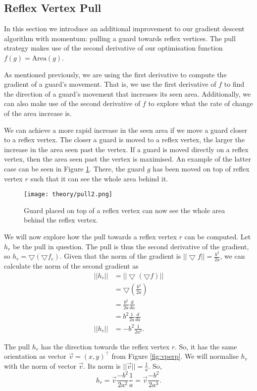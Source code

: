 \subsection{Reflex Vertex Pull}

In this section we introduce an additional improvement to our gradient descent algorithm with momentum: pulling a guard towards reflex vertices. The pull strategy makes use of the second derivative of our optimisation function $f(g) = \text{Area}(g)$.



As mentioned previously, we are using the first derivative to compute the gradient of a guard's movement. That is, we use the first derivative of $f$ to find the direction of a guard's movement that increases its seen area. Additionally, we can also make use of the second derivative of $f$ to explore what the rate of change of the area increase is. 

We can achieve a more rapid increase in the seen area if we move a guard closer to a reflex vertex. The closer a guard is moved to a reflex vertex, the larger the increase in the area seen past the vertex. If a guard is moved directly on a reflex vertex, then the area seen past the vertex is maximised. An example of the latter case can be seen in Figure \ref{fig:top_reflex_vertex}. There, the guard $g$ has been moved on top of reflex vertex $r$ such that it can see the whole area behind it.

\begin{figure}[h!]
    \centering
    \texttt{[image: theory/pull2.png]}
    \caption{Guard placed on top of a reflex vertex can now see the whole area behind the reflex vertex.}
    \label{fig:top_reflex_vertex}
\end{figure}

We will now explore how the pull towards a reflex vertex $r$ can be computed. Let $h_r$ be the pull in question. The pull is thus the second derivative of the gradient, so $h_r = \bigtriangledown (\bigtriangledown f_r)$. Given that the norm of the gradient is $||\bigtriangledown f|| = \frac{b^2}{2a}$, we can calculate the norm of the second gradient as 
\begin{align*}
||h_r||&= ||\bigtriangledown (\bigtriangledown f)|| \\
       &= \bigtriangledown (\frac{b^2}{2a}) \\
       &= \frac{b^2}{2a}\frac{d}{da} \\
       &= b^2\frac{1}{2a}\frac{d}{da} \\
||h_r||&= -b^2\frac{1}{2a^2}.
\end{align*}

The pull $h_r$ has the direction towards the reflex vertex $r$. So, it has the same orientation as vector $\vec{v} = (x, y)^\intercal$  from Figure \ref{fig:vperp}. We will normalise $h_r$ with the norm of vector $\vec{v}$. Its norm is $||\vec{v}|| = \frac 1 a$. So, $$h_r = \vec{v}\frac{-b^2}{2a^2}\frac 1 a = \vec{v}\frac{-b^2}{2a^3}.$$